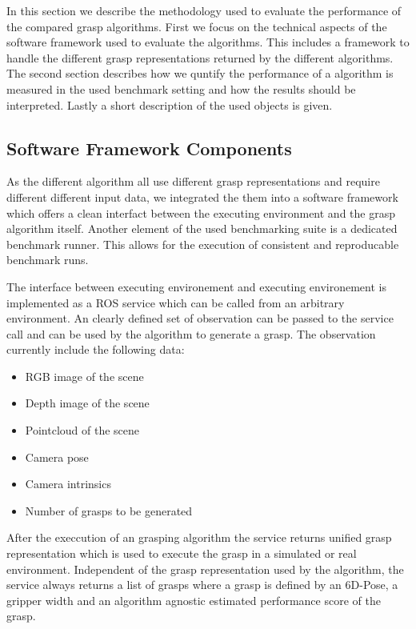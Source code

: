 In this section we describe the methodology used to evaluate the performance of the compared grasp algorithms.
First we focus on the technical aspects of the software framework used to evaluate the algorithms.
This includes a framework to handle the different grasp representations returned by the different algorithms.
The second section describes how we quntify the performance of a algorithm is measured in the used benchmark setting and how the results should be interpreted.
Lastly a short description of the used objects is given.


\subsection{Software Framework Components}
As the different algorithm all use different grasp representations and require different different input data, we integrated the them into
a software framework which offers a clean interfact between the executing environment and the grasp algorithm itself.
Another element of the used benchmarking suite is a dedicated benchmark runner. This allows for the execution of consistent and reproducable benchmark runs.

The interface between executing environement and executing environement is implemented as a ROS service which can be called from an arbitrary environment.
An clearly defined set of observation can be passed to the service call and can be used by the algorithm to generate a grasp.
The observation currently include the following data:
\begin{itemize}
    \item RGB image of the scene
    \item Depth image of the scene
    \item Pointcloud of the scene
    \item Camera pose
    \item Camera intrinsics
    \item Number of grasps to be generated
\end{itemize}
After the execcution of an grasping algorithm the service returns unified grasp representation which is used to execute the grasp in a simulated or real environment.
Independent of the grasp representation used by the algorithm, the service always returns a list of grasps where a grasp is defined by an 6D-Pose, a gripper width and
an algorithm agnostic estimated performance score of the grasp.

